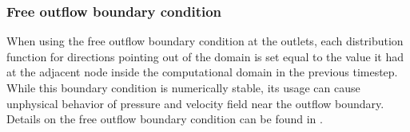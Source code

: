 \subsubsection*{Free outflow boundary condition}\label{symmetric bc}
When using the free outflow boundary condition at the outlets, each distribution function for directions pointing out of the domain is set equal to the value it had at the adjacent node inside the computational domain in the previous timestep. While this boundary condition is numerically stable, its usage can cause unphysical behavior of pressure and velocity field near the outflow boundary. Details on the free outflow boundary condition can be found in \cite{PE}.